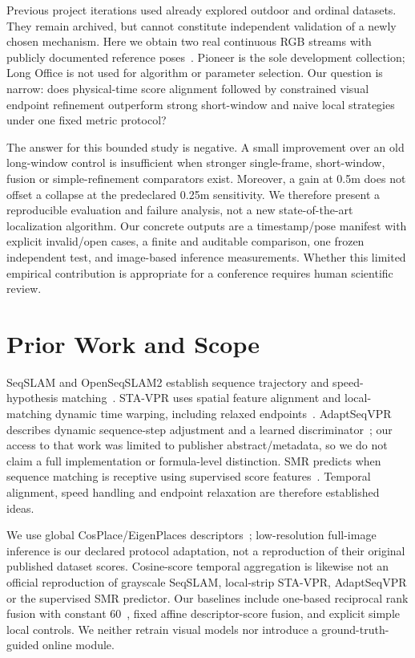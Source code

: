 \documentclass[conference,letterpaper]{IEEEtran}
\begin{document}
Previous project iterations used already explored outdoor and ordinal datasets. They remain archived, but cannot constitute independent validation of a newly chosen mechanism. Here we obtain two real continuous RGB streams with publicly documented reference poses~\cite{tum}. Pioneer is the sole development collection; Long Office is not used for algorithm or parameter selection. Our question is narrow: does physical-time score alignment followed by constrained visual endpoint refinement outperform strong short-window and naive local strategies under one fixed metric protocol?

The answer for this bounded study is negative. A small improvement over an old long-window control is insufficient when stronger single-frame, short-window, fusion or simple-refinement comparators exist. Moreover, a gain at 0.5m does not offset a collapse at the predeclared 0.25m sensitivity. We therefore present a reproducible evaluation and failure analysis, not a new state-of-the-art localization algorithm. Our concrete outputs are a timestamp/pose manifest with explicit invalid/open cases, a finite and auditable comparison, one frozen independent test, and image-based inference measurements. Whether this limited empirical contribution is appropriate for a conference requires human scientific review.

\section{Prior Work and Scope}
SeqSLAM and OpenSeqSLAM2 establish sequence trajectory and speed-hypothesis matching~\cite{seqslam,openseq}. STA-VPR uses spatial feature alignment and local-matching dynamic time warping, including relaxed endpoints~\cite{sta}. AdaptSeqVPR describes dynamic sequence-step adjustment and a learned discriminator~\cite{adapt}; our access to that work was limited to publisher abstract/metadata, so we do not claim a full implementation or formula-level distinction. SMR predicts when sequence matching is receptive using supervised score features~\cite{smr}. Temporal alignment, speed handling and endpoint relaxation are therefore established ideas.

We use global CosPlace/EigenPlaces descriptors~\cite{cosplace,eigenplaces}; low-resolution full-image inference is our declared protocol adaptation, not a reproduction of their original published dataset scores. Cosine-score temporal aggregation is likewise not an official reproduction of grayscale SeqSLAM, local-strip STA-VPR, AdaptSeqVPR or the supervised SMR predictor. Our baselines include one-based reciprocal rank fusion with constant 60~\cite{rrf}, fixed affine descriptor-score fusion, and explicit simple local controls. We neither retrain visual models nor introduce a ground-truth-guided online module.
\end{document}
